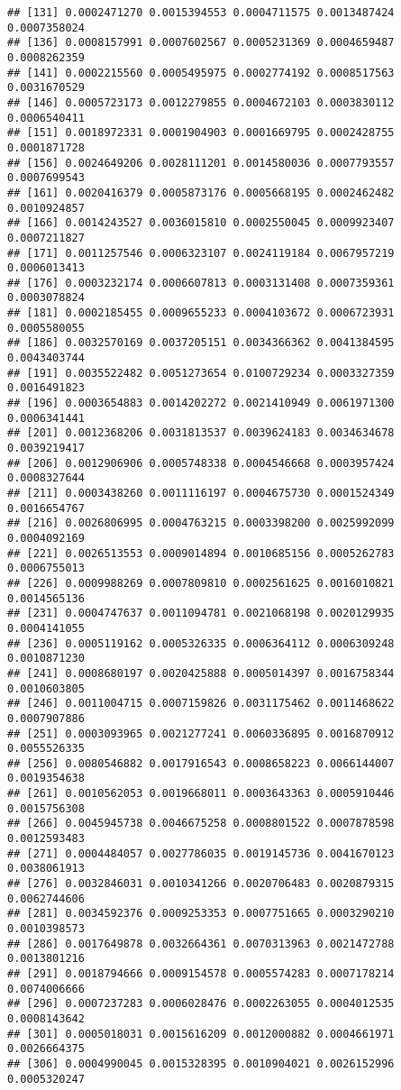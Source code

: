 \documentclass[
]{article}
\begin{document}
\begin{verbatim}
## [131] 0.0002471270 0.0015394553 0.0004711575 0.0013487424 0.0007358024
## [136] 0.0008157991 0.0007602567 0.0005231369 0.0004659487 0.0008262359
## [141] 0.0002215560 0.0005495975 0.0002774192 0.0008517563 0.0031670529
## [146] 0.0005723173 0.0012279855 0.0004672103 0.0003830112 0.0006540411
## [151] 0.0018972331 0.0001904903 0.0001669795 0.0002428755 0.0001871728
## [156] 0.0024649206 0.0028111201 0.0014580036 0.0007793557 0.0007699543
## [161] 0.0020416379 0.0005873176 0.0005668195 0.0002462482 0.0010924857
## [166] 0.0014243527 0.0036015810 0.0002550045 0.0009923407 0.0007211827
## [171] 0.0011257546 0.0006323107 0.0024119184 0.0067957219 0.0006013413
## [176] 0.0003232174 0.0006607813 0.0003131408 0.0007359361 0.0003078824
## [181] 0.0002185455 0.0009655233 0.0004103672 0.0006723931 0.0005580055
## [186] 0.0032570169 0.0037205151 0.0034366362 0.0041384595 0.0043403744
## [191] 0.0035522482 0.0051273654 0.0100729234 0.0003327359 0.0016491823
## [196] 0.0003654883 0.0014202272 0.0021410949 0.0061971300 0.0006341441
## [201] 0.0012368206 0.0031813537 0.0039624183 0.0034634678 0.0039219417
## [206] 0.0012906906 0.0005748338 0.0004546668 0.0003957424 0.0008327644
## [211] 0.0003438260 0.0011116197 0.0004675730 0.0001524349 0.0016654767
## [216] 0.0026806995 0.0004763215 0.0003398200 0.0025992099 0.0004092169
## [221] 0.0026513553 0.0009014894 0.0010685156 0.0005262783 0.0006755013
## [226] 0.0009988269 0.0007809810 0.0002561625 0.0016010821 0.0014565136
## [231] 0.0004747637 0.0011094781 0.0021068198 0.0020129935 0.0004141055
## [236] 0.0005119162 0.0005326335 0.0006364112 0.0006309248 0.0010871230
## [241] 0.0008680197 0.0020425888 0.0005014397 0.0016758344 0.0010603805
## [246] 0.0011004715 0.0007159826 0.0031175462 0.0011468622 0.0007907886
## [251] 0.0003093965 0.0021277241 0.0060336895 0.0016870912 0.0055526335
## [256] 0.0080546882 0.0017916543 0.0008658223 0.0066144007 0.0019354638
## [261] 0.0010562053 0.0019668011 0.0003643363 0.0005910446 0.0015756308
## [266] 0.0045945738 0.0046675258 0.0008801522 0.0007878598 0.0012593483
## [271] 0.0004484057 0.0027786035 0.0019145736 0.0041670123 0.0038061913
## [276] 0.0032846031 0.0010341266 0.0020706483 0.0020879315 0.0062744606
## [281] 0.0034592376 0.0009253353 0.0007751665 0.0003290210 0.0010398573
## [286] 0.0017649878 0.0032664361 0.0070313963 0.0021472788 0.0013801216
## [291] 0.0018794666 0.0009154578 0.0005574283 0.0007178214 0.0074006666
## [296] 0.0007237283 0.0006028476 0.0002263055 0.0004012535 0.0008143642
## [301] 0.0005018031 0.0015616209 0.0012000882 0.0004661971 0.0026664375
## [306] 0.0004990045 0.0015328395 0.0010904021 0.0026152996 0.0005320247

\end{verbatim}
\end{document}
